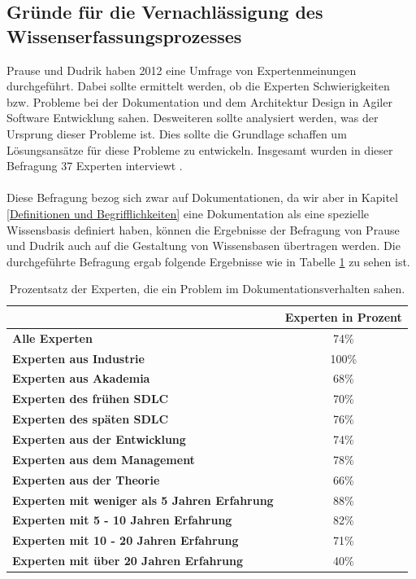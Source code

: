 \documentclass[a4paper,12pt]{scrartcl}
\begin{document}
\subsection{Gründe für die Vernachlässigung des Wissenserfassungsprozesses}
Prause und Dudrik haben 2012 eine Umfrage von Expertenmeinungen durchgeführt. Dabei sollte ermittelt werden, ob die Experten Schwierigkeiten bzw. Probleme bei der Dokumentation und dem Architektur Design in Agiler Software Entwicklung sahen. Desweiteren sollte analysiert werden, was der Ursprung dieser Probleme ist. Dies sollte die Grundlage schaffen um Lösungsansätze für diese Probleme zu entwickeln. Insgesamt wurden in dieser Befragung 37 Experten interviewt \cite{Prause2012}.
\\\\
Diese Befragung bezog sich zwar auf Dokumentationen, da wir aber in Kapitel \ref{Definitionen und Begrifflichkeiten} eine Dokumentation als eine spezielle Wissensbasis definiert haben, können die Ergebnisse der Befragung von Prause und Dudrik auch auf die Gestaltung von Wissensbasen übertragen werden. Die durchgeführte Befragung ergab folgende Ergebnisse wie in Tabelle \ref{ProblemTabelle} zu sehen ist.
\begin{table}[htb]
\begin{tabular}{|l|c|}\hline
\rule{0pt}{15pt}  & \textbf{Experten in Prozent}
\\
\hline
\rule{0pt}{15pt} \textbf{Alle Experten} & 74\%\\ 
\hline
\rule{0pt}{15pt} \textbf{Experten aus Industrie} & 100\% \\
\hline
\rule{0pt}{15pt} \textbf{Experten aus Akademia} & 68\%\\
\hline
\rule{0pt}{15pt} \textbf{Experten des frühen SDLC} & 70\%\\
\hline
\rule{0pt}{15pt} \textbf{Experten des späten SDLC} & 76\%\\
\hline
\rule{0pt}{15pt} \textbf{Experten aus der Entwicklung} & 74\%\\
\hline
\rule{0pt}{15pt} \textbf{Experten aus dem Management} & 78\%\\
\hline
\rule{0pt}{15pt} \textbf{Experten aus der Theorie} & 66\%\\
\hline
\rule{0pt}{15pt} \textbf{Experten mit weniger als 5 Jahren Erfahrung} & 88\%\\
\hline
\rule{0pt}{15pt} \textbf{Experten mit 5 - 10 Jahren Erfahrung} & 82\%\\
\hline
\rule{0pt}{15pt} \textbf{Experten mit 10 - 20 Jahren Erfahrung} & 71\%\\
\hline
\rule{0pt}{15pt} \textbf{Experten mit über 20 Jahren Erfahrung} & 40\%\\
\hline
\end{tabular}
\caption{Prozentsatz der Experten, die ein Problem im Dokumentationsverhalten sahen.}
\label{ProblemTabelle}
\end{table}
\end{document}
